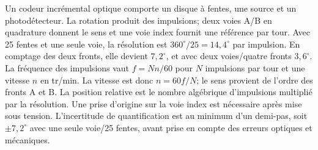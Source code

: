 \begin{corrigebox}
Un codeur incrémental optique comporte un disque à fentes, une source et
            un photodétecteur. La rotation produit des impulsions; deux voies A/B en
            quadrature donnent le sens et une voie index fournit une référence par tour.
Avec 25 fentes et une seule voie, la résolution est
            $360^\circ/25=\boxed{14,4^\circ}$ par impulsion. En comptage des deux fronts,
            elle devient $7,2^\circ$, et avec deux voies/quatre fronts $3,6^\circ$.
La fréquence des impulsions vaut $f=N n/60$ pour $N$ impulsions par tour
            et une vitesse $n$ en tr/min. La vitesse est donc $n=60f/N$; le sens provient
            de l'ordre des fronts A et B.
La position relative est le nombre algébrique d'impulsions multiplié par
            la résolution. Une prise d'origine sur la voie index est nécessaire après
            mise sous tension.
L'incertitude de quantification est au minimum d'un demi-pas, soit
            $\pm7,2^\circ$ avec une seule voie/25 fentes, avant prise en compte des erreurs
            optiques et mécaniques.
\end{corrigebox}
